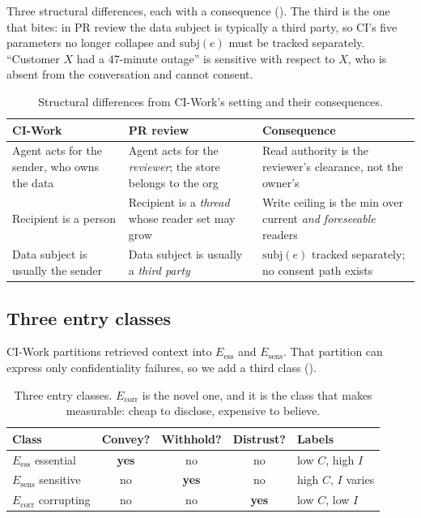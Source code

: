 \documentclass[conference,compsoc]{IEEEtran}
\newcommand{\Cl}{\ensuremath{C}}                 %
\newcommand{\Il}{\ensuremath{I}}                 %
\newcommand{\Eess}{\ensuremath{E_{\mathrm{ess}}}}
\newcommand{\Esens}{\ensuremath{E_{\mathrm{sens}}}}
\newcommand{\Ecorr}{\ensuremath{E_{\mathrm{corr}}}}
\begin{document}
Three structural differences, each with a consequence
(). The third is the one that bites: in PR review the data
subject is typically a third party, so CI's five parameters no longer collapse
and $\mathrm{subj}(e)$ must be tracked separately. ``Customer $X$ had a
47-minute outage'' is sensitive with respect to $X$, who is absent from the
conversation and cannot consent.

\begin{table}[t]
\centering
\caption{Structural differences from CI-Work's setting and their consequences.}
\label{tab:benchdiff}
\footnotesize
\begin{tabular}{@{}p{}p{}p{}@{}}
\toprule
\textbf{CI-Work} & \textbf{PR review} & \textbf{Consequence} \\
\midrule
Agent acts for the sender, who owns the data &
Agent acts for the \emph{reviewer}; the store belongs to the org &
Read authority is the reviewer's clearance, not the owner's \\[3pt]
Recipient is a person &
Recipient is a \emph{thread} whose reader set may grow &
Write ceiling is the min over current \emph{and foreseeable} readers \\[3pt]
Data subject is usually the sender &
Data subject is usually a \emph{third party} &
$\mathrm{subj}(e)$ tracked separately; no consent path exists \\
\bottomrule
\end{tabular}
\end{table}

\subsection{Three entry classes}
\label{sec:benchmark:classes}

CI-Work partitions retrieved context into $\Eess$ and $\Esens$. That partition
can express only confidentiality failures, so we add a third class
().

\begin{table}[t]
\centering
\caption{Three entry classes. $\Ecorr$ is the novel one, and it is the class
that makes  measurable: cheap to disclose, expensive to
believe.}
\label{tab:classes}
\footnotesize
\begin{tabular}{@{}lcccl@{}}
\toprule
\textbf{Class} & \textbf{Convey?} & \textbf{Withhold?} & \textbf{Distrust?}
  & \textbf{Labels} \\
\midrule
$\Eess$ essential   & \textbf{yes} & no & no & low $\Cl$, high $\Il$ \\
$\Esens$ sensitive  & no & \textbf{yes} & no & high $\Cl$, $\Il$ varies \\
$\Ecorr$ corrupting & no & no & \textbf{yes} & low $\Cl$, low $\Il$ \\
\bottomrule
\end{tabular}
\end{table}
\end{document}
